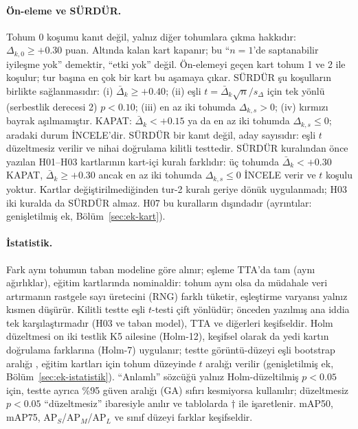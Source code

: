 \documentclass[pdflatex,iicol,sn-mathphys-num]{sn-jnl}
\begin{document}
\paragraph{Ön-eleme ve SÜRDÜR.}
Tohum 0 koşumu kanıt değil, yalnız diğer tohumlara çıkma hakkıdır: $\Delta_{k,0}\ge+0.30$ puan. Altında kalan kart kapanır; bu ``$n=1$'de saptanabilir iyileşme yok'' demektir, ``etki yok'' değil. Ön-elemeyi geçen kart tohum 1 ve 2 ile koşulur; tur başına en çok bir kart bu aşamaya çıkar. SÜRDÜR şu koşulların birlikte sağlanmasıdır: (i) $\bar\Delta_k\ge+0.40$; (ii) eşli $t=\bar\Delta_k\sqrt n/s_\Delta$ için tek yönlü (serbestlik derecesi 2) $p<0.10$; (iii) en az iki tohumda $\Delta_{k,s}>0$; (iv) kırmızı bayrak aşılmamıştır. KAPAT: $\bar\Delta_k<+0.15$ ya da en az iki tohumda $\Delta_{k,s}\le0$; aradaki durum İNCELE'dir. SÜRDÜR bir kanıt değil, aday sayısıdır: eşli $t$ düzeltmesiz verilir ve nihai doğrulama kilitli testtedir. SÜRDÜR kuralından önce yazılan H01--H03 kartlarının kart-içi kuralı farklıdır: üç tohumda $\bar\Delta_k<+0.30$ KAPAT, $\bar\Delta_k\ge+0.30$ ancak en az iki tohumda $\Delta_{k,s}\le0$ İNCELE verir ve $t$ koşulu yoktur. Kartlar değiştirilmediğinden tur-2 kuralı geriye dönük uygulanmadı; H03 iki kuralda da SÜRDÜR almaz. H07 bu kuralların dışındadır (ayrıntılar: genişletilmiş ek, Bölüm~\ref{sec:ek-kart}).

\paragraph{İstatistik.}
Fark aynı tohumun taban modeline göre alınır; eşleme TTA'da tam (aynı ağırlıklar), eğitim kartlarında nominaldir: tohum aynı olsa da müdahale veri artırmanın rastgele sayı üretecini (RNG) farklı tüketir, eşleştirme varyansı yalnız kısmen düşürür. Kilitli testte eşli $t$-testi çift yönlüdür; önceden yazılmış ana iddia tek karşılaştırmadır (H03 ve taban model), TTA ve diğerleri keşifseldir. Holm düzeltmesi \cite{holm_1979_sequential} on iki testlik K5 ailesine (Holm-12), keşifsel olarak da yedi kartın doğrulama farklarına (Holm-7) uygulanır; testte görüntü-düzeyi eşli bootstrap aralığı \cite{efron_1979_bootstrap}, eğitim kartları için tohum düzeyinde $t$ aralığı verilir (genişletilmiş ek, Bölüm~\ref{sec:ek-istatistik}). ``Anlamlı'' sözcüğü yalnız Holm-düzeltilmiş $p<0.05$ için, testte ayrıca \%95 güven aralığı (GA) sıfırı kesmiyorsa kullanılır; düzeltmesiz $p<0.05$ ``düzeltmesiz'' ibaresiyle anılır ve tablolarda $\dagger$ ile işaretlenir. mAP50, mAP75, AP$_S$/AP$_M$/AP$_L$ ve sınıf düzeyi farklar keşifseldir.
\end{document}
